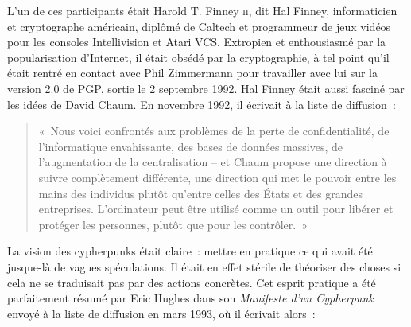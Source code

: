 L'un de ces participants était Harold T. Finney \textsc{ii}, dit Hal Finney, informaticien et cryptographe américain, diplômé de Caltech et programmeur de jeux vidéos pour les consoles Intellivision et Atari VCS. Extropien et enthousiasmé par la popularisation d'Internet, il était obsédé par la cryptographie, à tel point qu'il était rentré en contact avec Phil Zimmermann pour travailler avec lui sur la version 2.0 de PGP, sortie le 2 septembre 1992. Hal Finney était aussi fasciné par les idées de David Chaum. En novembre 1992, il écrivait à la liste de diffusion~:

\begin{quote}
«~Nous voici confrontés aux problèmes de la perte de confidentialité, de l'informatique envahissante, des bases de données massives, de l'augmentation de la centralisation -- et Chaum propose une direction à suivre complètement différente, une direction qui met le pouvoir entre les mains des individus plutôt qu'entre celles des États et des grandes entreprises. L'ordinateur peut être utilisé comme un outil pour libérer et protéger les personnes, plutôt que pour les contrôler.~»
\end{quote}

La vision des cypherpunks était claire~: mettre en pratique ce qui avait été jusque-là de vagues spéculations. Il était en effet stérile de théoriser des choses si cela ne se traduisait pas par des actions concrètes. Cet esprit pratique a été parfaitement résumé par Eric Hughes dans son \emph{Manifeste d'un Cypherpunk} envoyé à la liste de diffusion en mars 1993, où il écrivait alors~:


